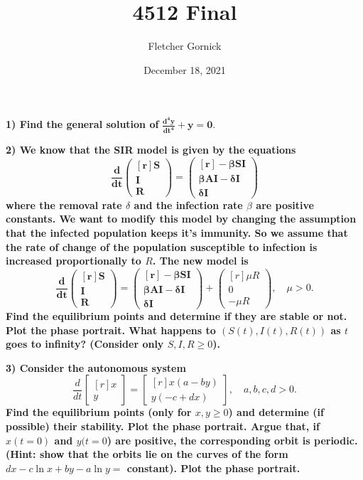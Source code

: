 \documentclass[11pt]{article}
\title{4512 Final}
\author{Fletcher Gornick}
\date{December 18, 2021}
\begin{document}
 \maketitle 
 \textbf{1) Find the general solution of } \(\mathbf{\displaystyle\frac{d^4 y}{dt^4} + y = 0.}\)
 \newpage

 \textbf{2) We know that the SIR model is given by the equations}
 \[\mathbf{\frac{d}{dt} \begin{pmatrix*}[r] S \\ I \\ R\end{pmatrix*}
   = \begin{pmatrix*}[r] -\beta S I \\ \beta A I - \delta I \\ \delta I\end{pmatrix*}}\]
 \textbf{where the removal rate \(\delta\) and the infection rate \(\beta\) are positive 
 constants. We want to modify this model by changing the assumption that the infected population 
 keeps it's immunity. So we assume that the rate of change of the population susceptible to 
 infection is increased proportionally to \(R\). The new model is}
 \[\mathbf{\frac{d}{dt} \begin{pmatrix*}[r] S \\ I \\ R\end{pmatrix*} = 
 \begin{pmatrix*}[r] -\beta S I \\ \beta A I - \delta I \\ \delta I\end{pmatrix*}} + 
 \begin{pmatrix*}[r] \mu R \\ 0 \\ -\mu R \end{pmatrix*}, \quad \mu > 0.\]
 \textbf{Find the equilibrium points and determine if they are stable or not. Plot the phase 
 portrait. What happens to \((S(t),I(t),R(t))\) as \(t\) goes to infinity? (Consider only 
 \(S,I,R \geq 0\)).}
 \newpage

 \textbf{3) Consider the autonomous system}
 \[\frac{d}{dt} \begin{bmatrix*}[r] x \\ y \end{bmatrix*} = 
   \begin{bmatrix*}[r] x(a-by) \\ y(-c+dx) \end{bmatrix*}, \quad a,b,c,d > 0.\]
 \textbf{Find the equilibrium points (only for \(x,y \geq 0\)) and determine (if possible)
 their stability. Plot the phase portrait. Argue that, if \(x(t=0)\) and \(y(t=0\)) are positive, 
 the corresponding orbit is periodic. (Hint: show that the orbits lie on the curves of the form 
 \(dx -c \ln x + by - a \ln y = \) constant). Plot the phase portrait.}
 \newpage 
\end{document}
